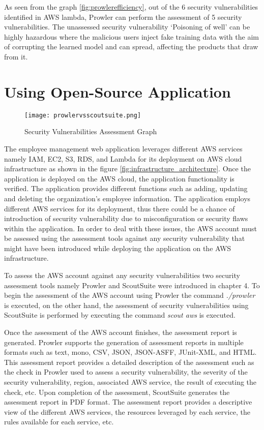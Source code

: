 \par As seen from the graph \ref{fig:prowlerefficiency}, out of the 6 security vulnerabilities identified in AWS lambda, Prowler can perform the assessment of 5 security vulnerabilities. The unassessed security vulnerability ‘Poisoning of well’ can be highly hazardous where the malicious users inject fake training data with the aim of corrupting the learned model and can spread, affecting the products that draw from it.

\section{Using Open-Source Application}

\begin{figure}
    \centering
    \texttt{[image: prowlervsscoutsuite.png]}
    \caption{Security Vulnerabilities Assessment Graph}
    \label{fig:prowlervsscoutsuite}
\end{figure}

\par The employee management web application leverages different AWS services namely IAM, EC2, S3, RDS, and Lambda for its deployment on AWS cloud infrastructure as shown in the figure \ref{fig:infrastructure_architecture}. Once the application is deployed on the AWS cloud, the application functionality is verified. The application provides different functions such as adding, updating and deleting the organization’s employee information. The application employs different AWS services for its deployment, thus there could be a chance of introduction of security vulnerability due to misconfiguration or security flaws within the application. In order to deal with these issues, the AWS account must be assessed using the assessment tools against any security vulnerability that might have been introduced while deploying the application on the AWS infrastructure.

\par To assess the AWS account against any security vulnerabilities two security assessment tools namely Prowler and ScoutSuite were introduced in chapter 4. To begin the assessment of the AWS account using Prowler the command \textit{./prowler} is executed, on the other hand, the assessment of security vulnerabilities using ScoutSuite is performed by executing the command \textit{scout aws} is executed.

\par Once the assessment of the AWS account finishes, the assessment report is generated. Prowler supports the generation of assessment reports in multiple formats such as text, mono, CSV, JSON, JSON-ASFF, JUnit-XML, and HTML. This assessment report provides a detailed description of the assessment such as the check in Prowler used to assess a security vulnerability, the severity of the security vulnerability, region, associated AWS service, the result of executing the check, etc. Upon completion of the assessment, ScoutSuite generates the assessment report in PDF format. The assessment report provides a descriptive view of the different AWS services, the resources leveraged by each service, the rules available for each service, etc.

